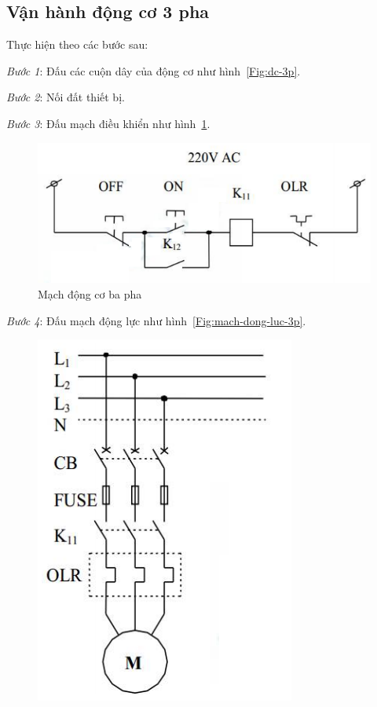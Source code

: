 \documentclass[13pt,a4paper]{extarticle}
\begin{document}
\subsection{Vận hành động cơ 3 pha}
Thực hiện theo các bước sau:
\begin{list}{--}{}
\item \textit{Bước 1}: Đấu các cuộn dây của động cơ như hình~\ref{Fig:dc-3p}.
\item \textit{Bước 2}: Nối đất thiết bị.
\item \textit{Bước 3}: Đấu mạch điều khiển như hình~\ref{Fig:mach-dieu-khien-3p}.
\begin{figure}[!h]
\begin{center}
\includegraphics[scale=.6]{van-hanh-3p-1}
\end{center}
\caption{Mạch động cơ ba pha}\label{Fig:mach-dieu-khien-3p}
\end{figure}
\item \textit{Bước 4}: Đấu mạch động lực như hình~\ref{Fig:mach-dong-luc-3p}.
\begin{figure}[!h]
\begin{center}
\includegraphics[scale=.6]{van-hanh-3p}

\end{center}
\end{figure}
\end{list}
\end{document}

